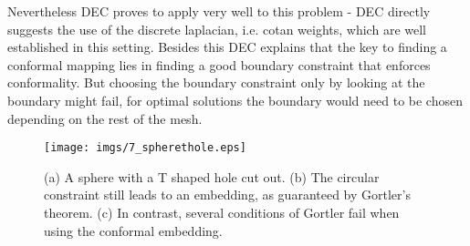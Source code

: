 Nevertheless DEC proves to apply very well to this problem - DEC directly suggests the use of the discrete laplacian, i.e. cotan weights, which are well established in this setting. Besides this DEC explains that the key to finding a conformal mapping lies in finding a good boundary constraint that enforces conformality. But choosing the boundary constraint only by looking at the boundary might fail, for optimal solutions the boundary would need to be chosen depending on the rest of the mesh.

\begin{figure}
\begin{center}
\texttt{[image: imgs/7\_spherethole.eps]}%
\end{center}
\caption{(a) A sphere with a T shaped hole cut out. (b) The circular constraint still leads to an embedding, as guaranteed by Gortler's theorem. (c) In contrast, several conditions of Gortler fail when using the conformal embedding.}%
\label{fig:6_Thole}%
\end{figure}








		

